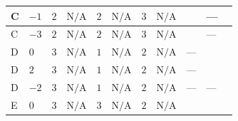 \documentclass[8pt]{article}
\begin{document}
\begin{landscape}
\begin{longtable}{@{}llcccccc >{\raggedright\arraybackslash}p{0.21\linewidth} >{\raggedright\arraybackslash}p{0.21\linewidth} >{\raggedright\arraybackslash}p{0.21\linewidth}@{}}
\midrule
C & $-1$ & $2$ & $\text{N/A}$ & $2$ & $\text{N/A}$ & $3$ & $\text{N/A}$ & \scriptsize\adjustbox{max width=\linewidth}{$\begin{gathered} -9 {g_2}^2 {\lambda_{S_2}^{(1)}}\end{gathered}$} & --- & \scriptsize\adjustbox{max width=\linewidth}{$\begin{gathered} +4 {\lambda_{12}^{(1)}}^2\end{gathered}$} \\
\midrule
C & $-3$ & $2$ & $\text{N/A}$ & $2$ & $\text{N/A}$ & $3$ & $\text{N/A}$ & \scriptsize\adjustbox{max width=\linewidth}{$\begin{gathered} -9 {g_2}^2 {\lambda_{S_2}^{(1)}}\end{gathered}$} & --- & \scriptsize\adjustbox{max width=\linewidth}{$\begin{gathered} +4 {\lambda_{12}^{(1)}}^2\end{gathered}$} \\
\midrule
D & $0$ & $3$ & $\text{N/A}$ & $1$ & $\text{N/A}$ & $2$ & $\text{N/A}$ & --- & \scriptsize\adjustbox{max width=\linewidth}{$\begin{gathered} +12 {g_1}^4\end{gathered}$} & \scriptsize\adjustbox{max width=\linewidth}{$\begin{gathered} +6 {\lambda_{12}^{(1)}}^2\end{gathered}$} \\
\midrule
D & $2$ & $3$ & $\text{N/A}$ & $1$ & $\text{N/A}$ & $2$ & $\text{N/A}$ & --- & \scriptsize\adjustbox{max width=\linewidth}{$\begin{gathered} 192 {g_1}^4\end{gathered}$} & \scriptsize\adjustbox{max width=\linewidth}{$\begin{gathered} +6 {\lambda_{12}^{(1)}}^2\end{gathered}$} \\
\midrule
D & $-2$ & $3$ & $\text{N/A}$ & $1$ & $\text{N/A}$ & $2$ & $\text{N/A}$ & --- & --- & \scriptsize\adjustbox{max width=\linewidth}{$\begin{gathered} +6 {\lambda_{12}^{(1)}}^2\end{gathered}$} \\
\midrule
E & $0$ & $3$ & $\text{N/A}$ & $3$ & $\text{N/A}$ & $2$ & $\text{N/A}$ & \scriptsize\adjustbox{max width=\linewidth}{$\begin{gathered} -24 {g_2}^2 {\lambda_{S_2}^{(1)}}\end{gathered}$} & \scriptsize\adjustbox{max width=\linewidth}{$\begin{gathered} +12 {g_1}^4\end{gathered}$} & \scriptsize\adjustbox{max width=\linewidth}{$\begin{gathered} +6 {\lambda_{12}^{(1)}}^2\end{gathered}$} \\

\end{longtable}
\end{landscape}
\end{document}
